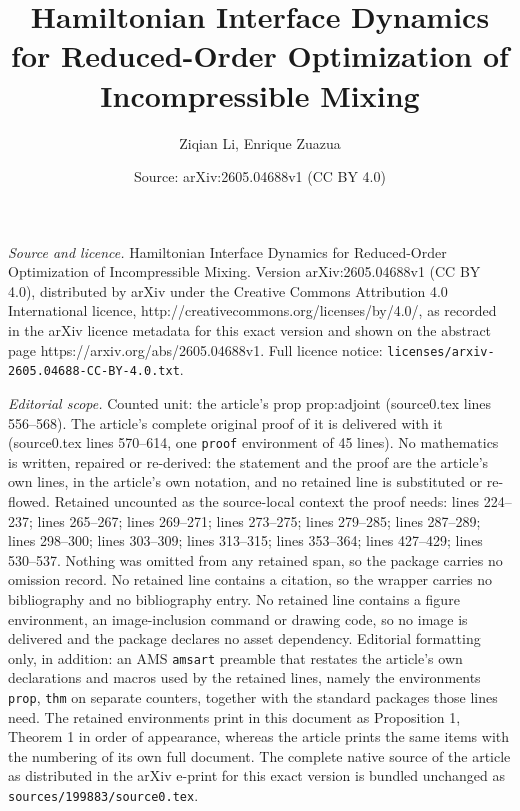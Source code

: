 \documentclass[10pt,a4paper]{amsart}
\title{Hamiltonian Interface Dynamics for Reduced-Order Optimization of Incompressible Mixing}
\author{Ziqian Li, Enrique Zuazua}
\date{Source: arXiv:2605.04688v1 (CC BY 4.0)}
\begin{document}
\maketitle

\noindent\emph{Source and licence.} Hamiltonian Interface Dynamics for Reduced-Order Optimization of Incompressible Mixing. Version arXiv:2605.04688v1 (CC BY 4.0), distributed by arXiv under the Creative Commons Attribution 4.0 International licence, http://creativecommons.org/licenses/by/4.0/, as recorded in the arXiv licence metadata for this exact version and shown on the abstract page https://arxiv.org/abs/2605.04688v1. Full licence notice: \texttt{licenses/arxiv-2605.04688-CC-BY-4.0.txt}.\par\smallskip

\noindent\textit{Editorial scope.} Counted unit: the article's prop prop:adjoint (source0.tex lines 556--568). The article's complete original proof of it is delivered with it (source0.tex lines 570--614, one \texttt{proof} environment of 45 lines). No mathematics is written, repaired or re-derived: the statement and the proof are the article's own lines, in the article's own notation, and no retained line is substituted or re-flowed.  Retained uncounted as the source-local context the proof needs: lines 224--237; lines 265--267; lines 269--271; lines 273--275; lines 279--285; lines 287--289; lines 298--300; lines 303--309; lines 313--315; lines 353--364; lines 427--429; lines 530--537.  Nothing was omitted from any retained span, so the package carries no omission record.  No retained line contains a citation, so the wrapper carries no bibliography and no bibliography entry.  No retained line contains a figure environment, an image-inclusion command or drawing code, so no image is delivered and the package declares no asset dependency.  Editorial formatting only, in addition: an AMS \texttt{amsart} preamble that restates the article's own declarations and macros used by the retained lines, namely the environments \texttt{prop}, \texttt{thm} on separate counters, together with the standard packages those lines need.  The retained environments print in this document as Proposition 1, Theorem 1 in order of appearance, whereas the article prints the same items with the numbering of its own full document.  The complete native source of the article as distributed in the arXiv e-print for this exact version is bundled unchanged as \texttt{sources/199883/source0.tex}.
\end{document}
